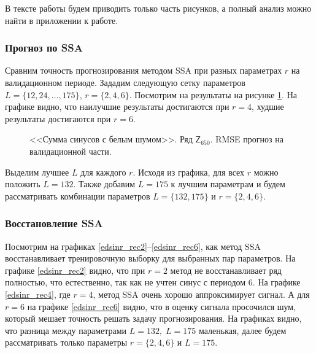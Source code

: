 \documentclass[specialist,
               substylefile = spbu.rtx,
               subf,href,colorlinks=true, 12p]{disser}
\begin{document}
В тексте работы будем приводить только часть рисунков, а полный анализ можно найти в приложении к работе.

\subsubsection{Прогноз по SSA}

Сравним точность прогнозирования методом SSA при разных параметрах $r$ на валидационном периоде. Зададим следующую сетку параметров $L = \{12, 24, \ldots, 175\}$, $r = \{2, 4, 6\}$. Посмотрим на результаты на рисунке \ref{edsinr_ssa_forecast}. На графике видно, что наилучшие результаты достигаются при $r = 4$, худшие результаты достигаются при $r = 6$.

\begin{figure}[H]
	\captionsetup{justification=centering}
	\caption{<<Сумма синусов с белым шумом>>. Ряд $\mathsf{Z}_{650}$. RMSE прогноз на валидационной части.}
	\label{edsinr_ssa_forecast}
\end{figure}

Выделим лучшее $L$ для каждого $r$. Исходя из графика, для всех $r$ можно положить $L = 132$. Также добавим $L = 175$ к лучшим параметрам и будем рассматривать комбинации параметров $L = \{132, 175\}$ и $r = \{2, 4, 6\}$.

\subsubsection{Восстановление SSA}
Посмотрим на графиках \ref{edsinr_rec2}--\ref{edsinr_rec6}, как метод SSA восстанавливает тренировочную выборку для выбранных пар параметров. На графике \ref{edsinr_rec2} видно, что при $r=2$ метод не восстанавливает ряд полностью, что естественно, так как не учтен синус с периодом 6.
На графике \ref{edsinr_rec4}, где $r = 4$, метод SSA очень хорошо аппроксимирует сигнал. А для $r = 6$ на графике \ref{edsinr_rec6} видно, что в оценку сигнала просочился шум, который мешает точность решать задачу прогнозирования. На графиках видно, что разница между параметрами $L = 132, \; L = 175$ маленькая, далее будем рассматривать только параметры $r = \{ 2, 4, 6 \}$ и $L = 175$.
\end{document}
